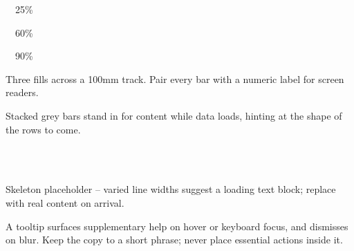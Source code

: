 \noindent{}\ \ {\small\color{muted}25\%}\par
\vspace{2mm}
\noindent{}\ \ {\small\color{muted}60\%}\par
\vspace{2mm}
\noindent{}\ \ {\small\color{muted}90\%}\par

\vspace{2mm}
{\small\color{muted}Three fills across a 100mm track. Pair every bar with a numeric label for screen readers.}


Stacked grey bars stand in for content while data loads, hinting at the shape of the rows to come.

\vspace{3mm}

\noindent{}\\[1.5mm]
\\[1.5mm]

\vspace{3mm}
{\small\color{muted}Skeleton placeholder -- varied line widths suggest a loading text block; replace with real content on arrival.}


\vspace{2mm}
\vspace{2mm}

{\small\color{muted}A tooltip surfaces supplementary help on hover or keyboard focus, and dismisses on blur. Keep the copy to a short phrase; never place essential actions inside it.}

\clearpage
